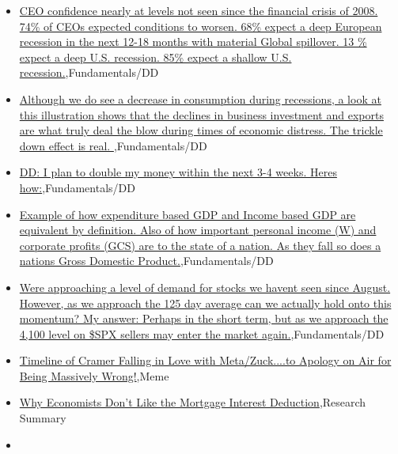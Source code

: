 \documentclass{article}%
\begin{document}
%
\begin{itemize}%
\item%
\href{https://reddit.com/r/StockMarket/comments/ygx4va/ceo\_confidence\_nearly\_at\_levels\_not\_seen\_since/}{CEO confidence nearly at levels not seen since the financial crisis of 2008. 74\% of CEOs expected conditions to worsen. 68\% expect a deep European recession in the next 12-18 months with material Global spillover. 13 \% expect a deep U.S. recession. 85\% expect a shallow U.S. recession.},Fundamentals/DD%
\item%
\href{https://reddit.com/r/StockMarket/comments/ygv2o1/although\_we\_do\_see\_a\_decrease\_in\_consumption/}{Although we do see a decrease in consumption during recessions, a look at this illustration shows that the declines in business investment and exports are what truly deal the blow during times of economic distress. The trickle down effect is real. },Fundamentals/DD%
\item%
\href{https://reddit.com/r/StockMarket/comments/ygt8px/dd\_i\_plan\_to\_double\_my\_money\_within\_the\_next\_34/}{DD: I plan to double my money within the next 3-4 weeks. Heres how:},Fundamentals/DD%
\item%
\href{https://reddit.com/r/StockMarket/comments/ygrlvl/example\_of\_how\_expenditure\_based\_gdp\_and\_income/}{Example of how expenditure based GDP and Income based GDP are equivalent by definition. Also of how important personal income (W) and corporate profits (GCS) are to the state of a nation. As they fall so does a nations Gross Domestic Product.},Fundamentals/DD%
\item%
\href{https://reddit.com/r/StockMarket/comments/ygp96x/were\_approaching\_a\_level\_of\_demand\_for\_stocks\_we/}{Were approaching a level of demand for stocks we havent seen since August. However, as we approach the 125 day average can we actually hold onto this momentum? My answer: Perhaps in the short term, but as we approach the 4,100 level on \$SPX sellers may enter the market again.},Fundamentals/DD%
\item%
\href{https://reddit.com/r/StockMarket/comments/ygm2bm/timeline\_of\_cramer\_falling\_in\_love\_with/}{Timeline of Cramer Falling in Love with Meta/Zuck....to Apology on Air for Being Massively Wrong!},Meme%
\item%
\href{https://reddit.com/r/Economics/comments/ygz2qp/why\_economists\_dont\_like\_the\_mortgage\_interest/}{Why Economists Don't Like the Mortgage Interest Deduction},Research Summary%
\item%

\end{itemize}
\end{document}
